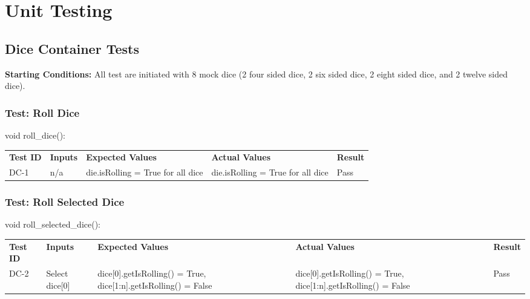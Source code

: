 \documentclass[12pt, titlepage]{article}
\begin{document}

\newpage
\section{Unit Testing}

\subsection{Dice Container Tests}

\textbf{Starting Conditions:} All test are initiated with 8 mock dice (2 four sided dice, 2 six sided dice, 2 eight sided dice, and 2 twelve sided dice).

\subsubsection{Test: Roll Dice}
void roll\_dice():\\
\begin{tabularx}{\textwidth}{|p{2cm}|p{3.5cm}|p{4cm}|p{4cm}|p{1.5cm}|}
    \cline{1-5}
    \textbf{Test ID} & \textbf{Inputs} & \textbf{Expected Values} & \textbf{Actual Values} & \textbf{Result} \\
    \cline{1-5}
    DC-1 & n/a & die.isRolling = True for all dice & die.isRolling = True for all dice & Pass \\
    \cline{1-5}
\end{tabularx}

\subsubsection{Test: Roll Selected Dice}
void roll\_selected\_dice():\\
\begin{tabularx}{\textwidth}{|p{2cm}|p{3.5cm}|p{4cm}|p{4cm}|p{1.5cm}|}
    \cline{1-5}
    \textbf{Test ID} & \textbf{Inputs} & \textbf{Expected Values} & \textbf{Actual Values} & \textbf{Result} \\
    \cline{1-5}
    DC-2 & Select dice[0] & dice[0].getIsRolling() = True, dice[1:n].getIsRolling() = False & dice[0].getIsRolling() = True, dice[1:n].getIsRolling() = False & Pass \\
    \cline{1-5}
\end{tabularx}
\end{document}
